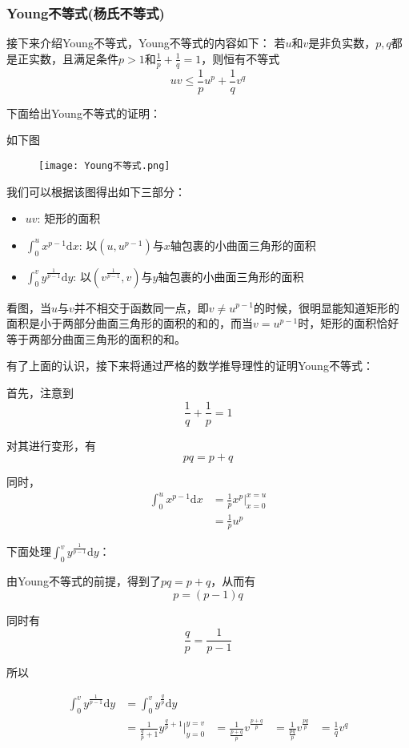 \documentclass[12pt, a4paper, oneside, UTF8]{ctexbook}
\begin{document}
\subsubsection{Young不等式(杨氏不等式)}
接下来介绍Young不等式，Young不等式的内容如下：
若$u$和$v$是非负实数，$p,q$都是正实数，且满足条件$p>1$和$\frac{1}{p}+\frac{1}{q}=1$，则恒有不等式\[uv\leq\frac{1}{p}u^p+\frac{1}{q}v^q\]

下面给出Young不等式的证明：

如下图
\begin{figure}[h]
    \centering
    \texttt{[image: Young不等式.png]}
    \label{fig:enter-label}
\end{figure}

我们可以根据该图得出如下三部分：

\begin{itemize}[leftmargin=4em]
    \item $uv$: 矩形的面积
    \item $\int_0^u x^{p-1}\mathrm{d}x$: 以$(u, u^{p-1})$与$x$轴包裹的小曲面三角形的面积
    \item $\int_0^{v} y^{\frac{1}{p-1}}\mathrm{d}y$: 以$(v^{\frac{1}{p-1}}, v)$与$y$轴包裹的小曲面三角形的面积
\end{itemize}

看图，当$u$与$v$并不相交于函数同一点，即$v\neq u^{p-1}$的时候，很明显能知道矩形的面积是小于两部分曲面三角形的面积的和的，而当$v= u^{p-1}$时，矩形的面积恰好等于两部分曲面三角形的面积的和。

有了上面的认识，接下来将通过严格的数学推导理性的证明Young不等式：

首先，注意到\[\frac{1}{q}+\frac{1}{p}=1\]

对其进行变形，有\[pq=p+q\]

同时，
\[
\begin{aligned}
    \int_0^u x^{p-1}\mathrm{d}x&=\frac{1}{p}x^p|_{x=0}^{x=u}\\
    &=\frac{1}{p}u^p
\end{aligned}
\]

下面处理$\int_0^{v} y^{\frac{1}{p-1}}\mathrm{d}y$：

由Young不等式的前提，得到了$pq=p+q$，从而有\[p=(p-1)q\]

同时有\[\frac{q}{p}=\frac{1}{p-1}\]

所以

\[
\begin{aligned}
    \int_{0}^v y^{\frac{1}{p-1}}\mathrm{d}y&=\int_0^v y^{\frac{q}{p}}\mathrm{d}y\\
    &=\frac{1}{\frac{q}{p}+1}y^{\frac{q}{p}+1}|_{y=0}^{y=v}
    &=\frac{1}{\frac{p+q}{p}}v^{\frac{p+q}{p}}
    &=\frac{1}{\frac{pq}{p}}v^{\frac{pq}{p}}
    &=\frac{1}{q}v^q
\end{aligned}
\]
\end{document}
